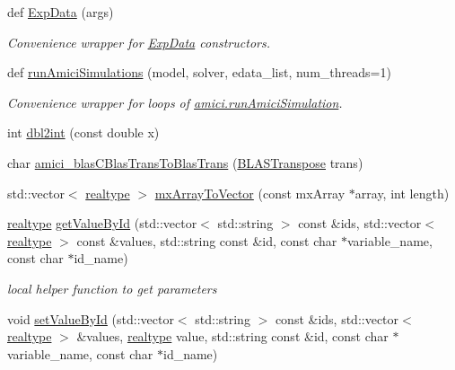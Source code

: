 \begin{DoxyCompactItemize}
def \mbox{\hyperlink{namespaceamici_a16e08939fd8d9ac0e61164a1a94acb05}{Exp\+Data}} (args)
\begin{DoxyCompactList}\small\item\em Convenience wrapper for \mbox{\hyperlink{classamici_1_1_exp_data}{Exp\+Data}} constructors. \end{DoxyCompactList}\item 
def \mbox{\hyperlink{namespaceamici_a9fcd2221445c4966d12cd57b4b7f688e}{run\+Amici\+Simulations}} (model, solver, edata\+\_\+list, num\+\_\+threads=1)
\begin{DoxyCompactList}\small\item\em Convenience wrapper for loops of \mbox{\hyperlink{namespaceamici_a46331a204e7511587acc2cc0b1ce7ed0}{amici.\+run\+Amici\+Simulation}}. \end{DoxyCompactList}\item 
int \mbox{\hyperlink{namespaceamici_a204c68962100d0020a37392fef2e95e2}{dbl2int}} (const double x)
\item 
char \mbox{\hyperlink{namespaceamici_a800e4c3e12f712281a4355e765402260}{amici\+\_\+blas\+C\+Blas\+Trans\+To\+Blas\+Trans}} (\mbox{\hyperlink{namespaceamici_a0f0ec77c6c8f48d9c5cb50d54899afae}{B\+L\+A\+S\+Transpose}} trans)
\item 
std\+::vector$<$ \mbox{\hyperlink{namespaceamici_a1bdce28051d6a53868f7ccbf5f2c14a3}{realtype}} $>$ \mbox{\hyperlink{namespaceamici_af8f91dbb6a395a9907c59dd92991ec18}{mx\+Array\+To\+Vector}} (const mx\+Array $\ast$array, int length)
\item 
\mbox{\hyperlink{namespaceamici_a1bdce28051d6a53868f7ccbf5f2c14a3}{realtype}} \mbox{\hyperlink{namespaceamici_a00a3387dd5fe07628c21a763aee28036}{get\+Value\+By\+Id}} (std\+::vector$<$ std\+::string $>$ const \&ids, std\+::vector$<$ \mbox{\hyperlink{namespaceamici_a1bdce28051d6a53868f7ccbf5f2c14a3}{realtype}} $>$ const \&values, std\+::string const \&id, const char $\ast$variable\+\_\+name, const char $\ast$id\+\_\+name)
\begin{DoxyCompactList}\small\item\em local helper function to get parameters \end{DoxyCompactList}\item 
void \mbox{\hyperlink{namespaceamici_a939bff838284994570395c19eb40923d}{set\+Value\+By\+Id}} (std\+::vector$<$ std\+::string $>$ const \&ids, std\+::vector$<$ \mbox{\hyperlink{namespaceamici_a1bdce28051d6a53868f7ccbf5f2c14a3}{realtype}} $>$ \&values, \mbox{\hyperlink{namespaceamici_a1bdce28051d6a53868f7ccbf5f2c14a3}{realtype}} value, std\+::string const \&id, const char $\ast$variable\+\_\+name, const char $\ast$id\+\_\+name)

\end{DoxyCompactItemize}
